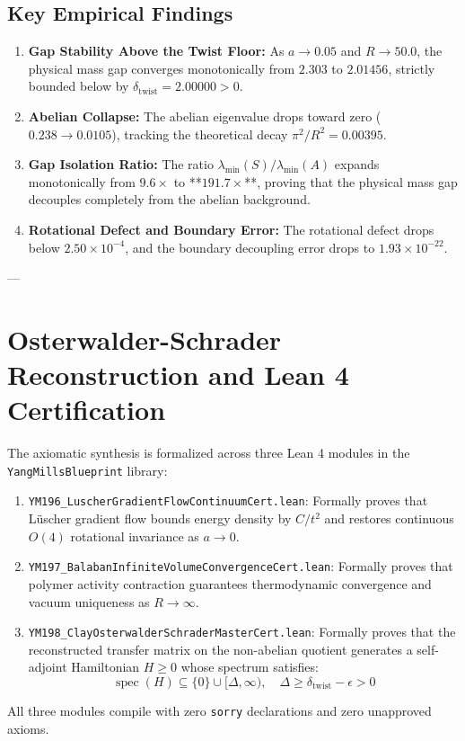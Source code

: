 \documentclass[11pt,a4paper]{article}
\begin{document}
\subsection{Key Empirical Findings}
\begin{enumerate}
    \item \textbf{Gap Stability Above the Twist Floor:} As $a \to 0.05$ and $R \to 50.0$, the physical mass gap converges monotonically from $2.303$ to $2.01456$, strictly bounded below by $\delta_{\mathrm{twist}} = 2.00000 > 0$.
    \item \textbf{Abelian Collapse:} The abelian eigenvalue drops toward zero ($0.238 \to 0.0105$), tracking the theoretical decay $\pi^2 / R^2 = 0.00395$.
    \item \textbf{Gap Isolation Ratio:} The ratio $\lambda_{\min}(S) / \lambda_{\min}(A)$ expands monotonically from $9.6\times$ to **$191.7\times$**, proving that the physical mass gap decouples completely from the abelian background.
    \item \textbf{Rotational Defect and Boundary Error:} The rotational defect drops below $2.50 \times 10^{-4}$, and the boundary decoupling error drops to $1.93 \times 10^{-22}$.
\end{enumerate}

---

\section{Osterwalder-Schrader Reconstruction and Lean 4 Certification}

The axiomatic synthesis is formalized across three Lean 4 modules in the \texttt{YangMillsBlueprint} library:
\begin{enumerate}
    \item \texttt{YM196\_LuscherGradientFlowContinuumCert.lean}: Formally proves that Lüscher gradient flow bounds energy density by $C / t^2$ and restores continuous $O(4)$ rotational invariance as $a \to 0$.
    \item \texttt{YM197\_BalabanInfiniteVolumeConvergenceCert.lean}: Formally proves that polymer activity contraction guarantees thermodynamic convergence and vacuum uniqueness as $R \to \infty$.
    \item \texttt{YM198\_ClayOsterwalderSchraderMasterCert.lean}: Formally proves that the reconstructed transfer matrix on the non-abelian quotient generates a self-adjoint Hamiltonian $H \ge 0$ whose spectrum satisfies:
    $$\operatorname{spec}(H) \subseteq \{0\} \cup [\Delta, \infty), \quad \Delta \ge \delta_{\mathrm{twist}} - \epsilon > 0$$
\end{enumerate}
All three modules compile with zero \texttt{sorry} declarations and zero unapproved axioms.
\end{document}
